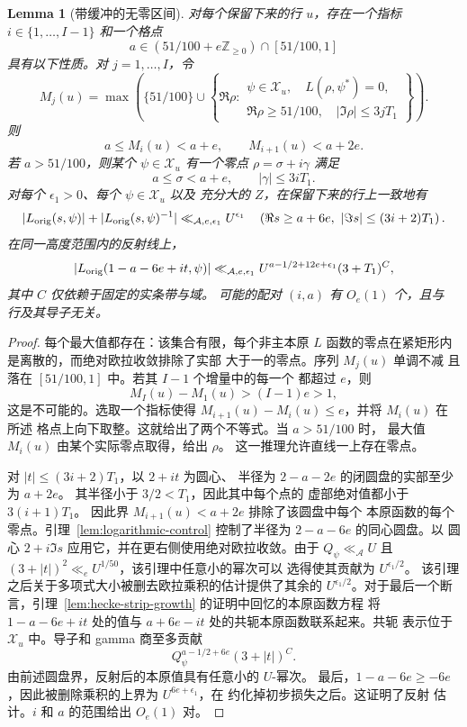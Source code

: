 \documentclass[11pt,a4paper]{article}
\numberwithin{equation}{section}
\numberwithin{figure}{section}
\newtheorem{lemma}[theorem]{Lemma}
\theoremstyle{definition}
\theoremstyle{remark}
\begin{document}
\begin{lemma}[带缓冲的无零区间]\label{lem:buffered-bins}
对每个保留下来的行 \(u\)，存在一个指标
\(i\in\{1,\ldots,I-1\}\) 和一个格点
\[
 a\in(51/100+e\mathbb Z_{\ge0})\cap[51/100,1]
\]
具有以下性质。对 \(j=1,\ldots,I\)，令
\[
 M_j(u)=\max\left(\{51/100\}\cup
 \left\{\Re\rho:
 \begin{array}{l}
  \psi\in\mathcal X_u,\quad L(\rho,\psi^*)=0,\\
  \Re\rho\ge51/100,\quad |\Im\rho|\le3jT_1
 \end{array}\right\}\right).
\]
则
\[
 a\le M_i(u)<a+e,\qquad M_{i+1}(u)<a+2e.
\]
若 \(a>51/100\)，则某个 \(\psi\in\mathcal X_u\) 有一个零点
\(\rho=\sigma+i\gamma\) 满足
\[
 a\le\sigma<a+e,\qquad |\gamma|\le3iT_1.
\]
对每个 \(\epsilon_1>0\)、每个 \(\psi\in\mathcal X_u\) 以及
充分大的 \(Z\)，在保留下来的行上一致地有
\[
 |L_{\rm orig}(s,\psi)|+|L_{\rm orig}(s,\psi)^{-1}|
 \ll_{\mathcal A,e,\epsilon_1} U^{\epsilon_1}
 \quad
 \left(\Re s\ge a+6e,\ |\Im s|\le(3i+2)T_1\right).
\]
在同一高度范围内的反射线上，
\[
 |L_{\rm orig}(1-a-6e+it,\psi)|
 \ll_{\mathcal A,e,\epsilon_1}
 U^{a-1/2+12e+\epsilon_1}(3+T_1)^C,
\]
其中 \(C\) 仅依赖于固定的实条带与域。
可能的配对 \((i,a)\) 有 \(O_e(1)\) 个，且与
行及其导子无关。
\end{lemma}

\begin{proof}
每个最大值都存在：该集合有限，每个非主本原
\(L\) 函数的零点在紧矩形内是离散的，而绝对欧拉收敛排除了实部
大于一的零点。序列 \(M_j(u)\) 单调不减
且落在 \([51/100,1]\) 中。若其 \(I-1\) 个增量中的每一个
都超过 \(e\)，则
\[
 M_I(u)-M_1(u)>(I-1)e>1,
\]
这是不可能的。选取一个指标使得
\(M_{i+1}(u)-M_i(u)\le e\)，并将 \(M_i(u)\) 在所述
格点上向下取整。这就给出了两个不等式。当 \(a>51/100\) 时，
最大值 \(M_i(u)\) 由某个实际零点取得，给出 \(\rho\)。
这一推理允许直线一上存在零点。

对 \(|t|\le(3i+2)T_1\)，以 \(2+it\) 为圆心、
半径为 \(2-a-2e\) 的闭圆盘的实部至少为 \(a+2e\)。
其半径小于 \(3/2<T_1\)，因此其中每个点的
虚部绝对值都小于 \(3(i+1)T_1\)。
因此界 \(M_{i+1}(u)<a+2e\) 排除了该圆盘中每个
本原函数的每个零点。引理~\ref{lem:logarithmic-control}
控制了半径为 \(2-a-6e\) 的同心圆盘。以
圆心 \(2+i\Im s\) 应用它，并在更右侧使用绝对欧拉收敛。由于 \(Q_\psi\ll_{\mathcal A}U\) 且
\((3+|t|)^2\ll_e U^{1/50}\)，该引理中任意小的幂次可以
选得使其贡献为 \(U^{\epsilon_1/2}\)。
该引理之后关于多项式大小被删去欧拉乘积的估计提供了其余的 \(U^{\epsilon_1/2}\)。对于最后一个断言，引理~\ref{lem:hecke-strip-growth} 的证明中回忆的本原函数方程
\cite[Equation (1.1)]{GZ} 将 \(1-a-6e+it\) 处的值与
\(a+6e-it\) 处的共轭本原函数联系起来。共轭
表示位于 \(\mathcal X_u\) 中。导子和 gamma
商至多贡献
\[
 Q_\psi^{a-1/2+6e}(3+|t|)^C.
\]
由前述圆盘界，反射后的本原值具有任意小的 \(U\)-幂次。
最后，\(1-a-6e\ge-6e\)，因此被删除乘积的上界为 \(U^{6e+\epsilon_1}\)，在
约化掉初步损失之后。这证明了反射
估计。\(i\) 和 \(a\) 的范围给出 \(O_e(1)\) 对。
\end{proof}
\end{document}
